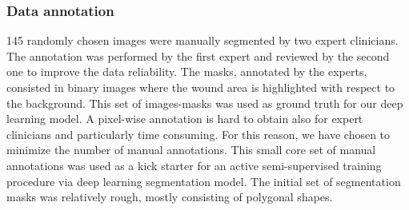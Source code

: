 \documentclass[../main.tex]{subfiles}
\begin{document}
\subsubsection{Data annotation}
145 randomly chosen images were manually segmented by two expert clinicians.
The annotation was performed by the first expert and reviewed by the second one to improve the data reliability.
The masks, annotated by the experts, consisted in binary images where the wound area is highlighted with respect to the background.
This set of images-masks was used as ground truth for our deep learning model. 
A pixel-wise annotation is hard to obtain also for expert clinicians and particularly time consuming.
For this reason, we have chosen to minimize the number of manual annotations.
This small core set of manual annotations was used as a kick starter for an active semi-supervised training procedure via deep learning segmentation model. 
The initial set of segmentation masks was relatively rough, mostly consisting of polygonal shapes. 
\end{document}
